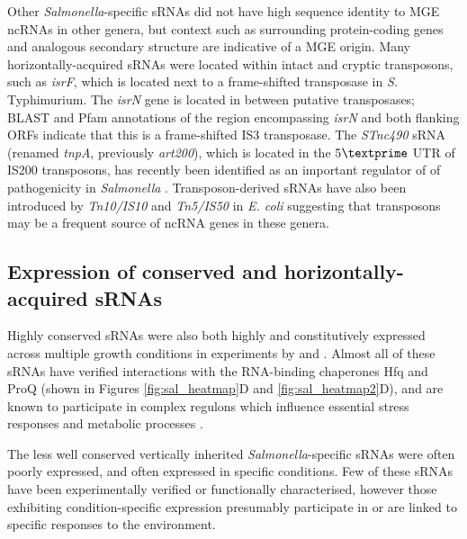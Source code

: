 Other \textit{Salmonella}-specific sRNAs did not have high sequence identity to MGE ncRNAs in other genera, but context such as surrounding protein-coding genes and analogous secondary structure \citep{Hershko-Shalev2016-kv} are indicative of a MGE origin. Many horizontally-acquired sRNAs were located within intact and cryptic transposons, such as  \textit{isrF}, which is located next to a frame-shifted transposase in \textit{S.} Typhimurium. The \textit{isrN} gene is located in between putative transposases; BLAST and Pfam annotations of the region encompassing \textit{isrN} and both flanking ORFs indicate that this is a frame-shifted IS3 transposase. The \textit{STnc490} sRNA (renamed \textit{tnpA}, previously \textit{art200}), which is located in the 5$\textprime$ UTR of IS200 transposons, has recently been identified as an important regulator of of pathogenicity in \textit{Salmonella} \citep{Ellis2018-zu,Ellis2017-uvv}. Transposon-derived sRNAs have also been introduced by \textit{Tn10/IS10} and \textit{Tn5/IS50} in \textit{E. coli} \citep{Ross2013-ee,Ross2014-ux,Ellis2015-we} suggesting that transposons may be a frequent source of ncRNA genes in these genera.

\subsection{Expression of conserved and horizontally-acquired sRNAs}


Highly conserved sRNAs were also both highly and constitutively expressed across multiple growth conditions in experiments by \cite{Kroger2012-cr} and \cite{Kroger2013-pg}. Almost all of these sRNAs have verified interactions with the RNA-binding chaperones Hfq and ProQ \citep{Smirnov2016-yt,Holmqvist2016-hj} (shown in Figures \ref{fig:sal_heatmap}D and \ref{fig:sal_heatmap2}D), and are known to participate in complex regulons which influence essential stress responses and metabolic processes \citep{Updegrove2015-vu}.

The less well conserved vertically inherited \textit{Salmonella}-specific sRNAs were often poorly expressed, and often expressed in specific conditions. Few of these sRNAs have been experimentally verified or functionally characterised, however those exhibiting condition-specific expression presumably participate in or are linked to specific responses to the environment. 

